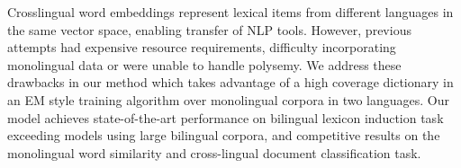 Crosslingual word embeddings represent lexical items from different languages in the same vector space, enabling transfer of NLP tools. However, previous attempts had expensive resource requirements, difficulty incorporating monolingual data or were unable to handle polysemy. We address these drawbacks in our method which takes advantage of a high coverage dictionary in an EM style training algorithm over monolingual corpora in two languages. Our model achieves state-of-the-art performance on bilingual lexicon induction task exceeding models using large bilingual corpora, and competitive results on the monolingual word similarity and cross-lingual document classification task.
